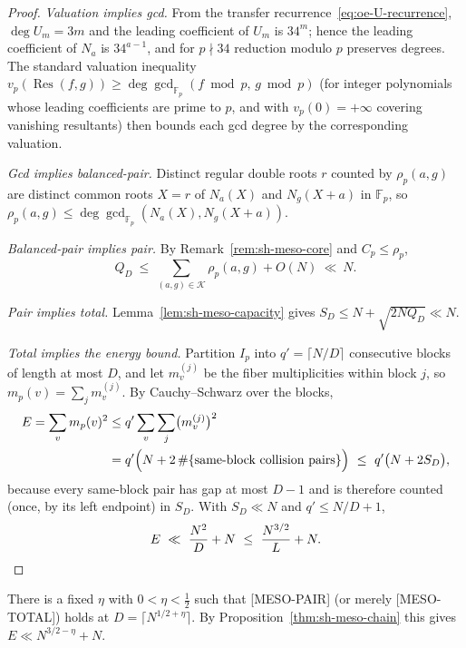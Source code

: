 \begin{proof}
\emph{Valuation implies gcd.}  From the transfer
recurrence~\eqref{eq:oe-U-recurrence}, $\deg U_m=3m$ and the leading
coefficient of $U_m$ is $34^m$; hence the leading coefficient of $N_a$
is $34^{a-1}$, and for $p\nmid34$ reduction modulo $p$ preserves
degrees.  The standard valuation inequality
$v_p(\operatorname{Res}(f,g))\ge
\deg\gcd_{\mathbb F_p}(f\bmod p,\,g\bmod p)$ (for integer polynomials
whose leading coefficients are prime to $p$, and with $v_p(0)=+\infty$
covering vanishing resultants) then bounds each gcd degree by the
corresponding valuation.

\emph{Gcd implies balanced-pair.}  Distinct regular double roots $r$
counted by $\rho_p(a,g)$ are distinct common roots $X=r$ of
$N_a(X)$ and $N_g(X+a)$ in $\mathbb F_p$, so
$\rho_p(a,g)\le\deg\gcd_{\mathbb F_p}(N_a(X),N_g(X+a))$.

\emph{Balanced-pair implies pair.}  By
Remark~\ref{rem:sh-meso-core} and $C_p\le\rho_p$,
\[
 Q_D\ \le\ \sum_{(a,g)\in\mathcal K}\rho_p(a,g)+O(N)\ \ll\ N .
\]

\emph{Pair implies total.}  Lemma~\ref{lem:sh-meso-capacity} gives
$S_D\le N+\sqrt{2NQ_D}\ll N$.

\emph{Total implies the energy bound.}  Partition $I_p$ into
$q'=\lceil N/D\rceil$ consecutive blocks of length at most $D$, and
let $m_v^{(j)}$ be the fiber multiplicities within block $j$, so
$m_p(v)=\sum_jm_v^{(j)}$.  By Cauchy--Schwarz over the blocks,
\begin{align*}
 E=\sum_vm_p(v)^2
 &\le q'\sum_v\sum_j\bigl(m_v^{(j)}\bigr)^2\\
 &= q'\Bigl(N+2\,\#\{\text{same-block collision pairs}\}\Bigr)
 \ \le\ q'\bigl(N+2S_D\bigr),
\end{align*}
because every same-block pair has gap at most $D-1$ and is therefore
counted (once, by its left endpoint) in $S_D$.  With $S_D\ll N$ and
$q'\le N/D+1$,
\[
 E\ \ll\ \frac{N^2}{D}+N\ \le\ \frac{N^{3/2}}{L}+N . \qedhere
\]
\end{proof}

\begin{conjecture}
\label{conj:sh-meso-eta}
There is a fixed $\eta$ with $0<\eta<\tfrac12$ such that
[MESO-PAIR] (or merely [MESO-TOTAL]) holds at
$D=\lceil N^{1/2+\eta}\rceil$.  By
Proposition~\ref{thm:sh-meso-chain} this gives
$E\ll N^{3/2-\eta}+N$.
\end{conjecture}

